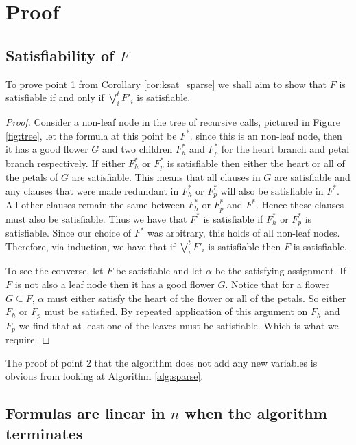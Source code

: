 \section{Proof}
\subsection{Satisfiability of \texorpdfstring{$F$}{Formula}}
To prove point 1 from Corollary \ref{cor:ksat_sparse}
we shall aim to show that $F$ is satisfiable if and only if $\bigvee_{i}^{t}F'_i$ is satisfiable.
\begin{proof}
    Consider a non-leaf node in the tree of recursive calls, pictured in Figure \ref{fig:tree}, let
    the formula at this point be $F^{\ast}$. since this is an non-leaf node, then it has a good
    flower $G$ and two children $F_h^{\ast}$ and $F_p^{\ast}$ for the heart branch and petal branch respectively.
    If either $F_h^{\ast}$ or $F_p^{\ast}$ is satisfiable then either the heart or all of the petals of $G$
    are satisfiable. This means that all clauses in $G$ are satisfiable and any clauses that were made
    redundant in $F_h^{\ast}$ or $F_p^{\ast}$ will also be satisfiable in $F^{\ast}$. All other clauses
    remain the same between $F_h^{\ast}$ or $F_p^{\ast}$ and $F^{\ast}$. Hence these clauses must also be
    satisfiable. Thus we have that $F^{\ast}$ is satisfiable if $F_h^{\ast}$ or $F_p^{\ast}$ is satisfiable.
    Since our choice of $F^{\ast}$ was arbitrary, this holds of all non-leaf nodes. Therefore, via induction, we have that if
    $\bigvee_{i}^{t}F'_i$ is satisfiable then $F$ is satisfiable.
    
    To see the converse, let $F$ be satisfiable and let $\alpha$ be the satisfying assignment.
    If $F$ is not also a leaf node then it has a good flower $G$.
    Notice that for a flower $G \subseteq F$, $\alpha$ must either satisfy the heart of the flower
    or all of the petals. So either $F_h$ or $F_p$ must be satisfied. By repeated application of this argument on $F_h$ and $F_p$
    we find that at least one of the leaves must be satisfiable. Which is what we require.
\end{proof}

The proof of point 2 that the algorithm does not add any new variables is obvious from looking at
Algorithm \ref{alg:sparse}.

\subsection{Formulas are linear in \texorpdfstring{$n$}{n} when the algorithm terminates}

